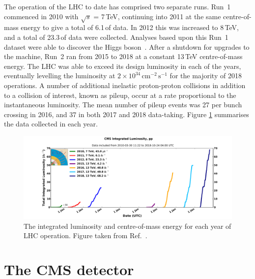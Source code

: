 The operation of the LHC to date has comprised two separate runs.
Run~1 commenced in 2010 with $\sqrt{s}$ = 7\,TeV, continuing into 2011 at the same centre-of-mass energy to give a total of 6.1\,\fb of data.
In 2012 this was increased to 8\,TeV, and a total of 23.3\,\fb of data were collected.
Analyses based upon this Run~1 dataset were able to discover the Higgs boson~\cite{ATLASdiscovery,CMSdiscovery}.
After a shutdown for upgrades to the machine, Run~2 ran from 2015 to 2018 at a constant 13\,TeV centre-of-mass energy.
The LHC was able to exceed its design luminosity in each of the years, eventually levelling the luminosity at $2\times10^{34}\,\textrm{cm}^{-2}\,\textrm{s}^{-1}$ for the majority of 2018 operations.
A number of additional inelastic proton-proton collisions in addition to a collision of interest, known as pileup, occur at a rate proportional to the instantaneous luminosity.
The mean number of pileup events was 27 per bunch crossing in 2016, and 37 in both 2017 and 2018 data-taking.
Figure \ref{fig:detector_Run1andRun2lumi} summarises the data collected in each year.

\begin{figure}[h!]
  \centering
  \includegraphics[width=\textwidth]{Figures/Detector/Run1andRun2lumi.pdf}
  \caption[LHC integrated luminosity and centre-of-mass energy per year.]
  {The integrated luminosity and centre-of-mass energy for each year of LHC operation.
  Figure taken from Ref.~\cite{CMSLumiPublic}.}
  \label{fig:detector_Run1andRun2lumi}
\end{figure}

\section{The CMS detector}


